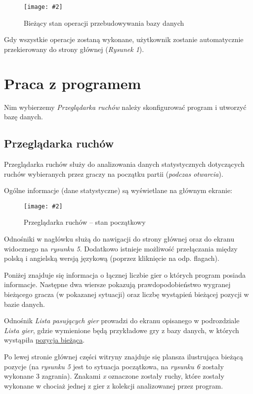 \documentclass[10pt,leqno]{article}
\newcommand{\myimage}[3]{
  \begin{figure}[h!]
    \centering
      \texttt{[image: \#2]}
  \caption{#3}
  \end{figure}
}
\begin{document}
\myimage{0.4}{status.png}{Bieżący stan operacji przebudowywania bazy danych}

Gdy wszystkie operacje zostaną wykonane, użytkownik zostanie automatycznie przekierowany do strony głównej (\emph{Rysunek 1}).

\newpage

\section{Praca z programem}
Nim wybierzemy \emph{Przeglądarka ruchów} należy skonfigurować program i utworzyć bazę danych.

\subsection{Przeglądarka ruchów}

Przeglądarka ruchów służy do analizowania danych statystycznych dotyczących ruchów 
wybieranych przez graczy na początku partii (\emph{podczas otwarcia}).

Ogólne informacje (dane statystyczne) są wyświetlane na głównym ekranie:

\myimage{0.47}{moveBrowserMain.png}{Przeglądarka ruchów -- stan początkowy}

\noindent Odnośniki w nagłówku służą do nawigacji do strony głównej oraz do ekranu widocznego na \emph{rysunku 5}. 
Dodatkowo istnieje możliwość przełączania między polską i angielską wersją językową (poprzez kliknięcie na odp. flagach).

\vspace{0.5em}

\noindent Poniżej znajduje się informacja o łącznej liczbie gier o których program posiada informacje. Następne dwa wiersze pokazują
prawdopodobieństwo wygranej bieżącego gracza (w pokazanej sytuacji) oraz liczbę wystąpień bieżącej pozycji w bazie danych.

\vspace{0.5em}

\noindent Odnośnik \emph{Lista pasujących gier} prowadzi do ekranu opisanego w podrozdziale \emph{Lista gier}, gdzie wymienione będą
przykładowe gry z bazy danych, w których wystąpiła \underline{pozycja bieżąca}.

\vspace{0.5em}

\noindent Po lewej stronie głównej części witryny znajduje się plansza ilustrująca bieżącą pozycje (na \emph{rysunku 5} jest to sytuacja początkowa, 
na \emph{rysunku 6} zostały wykonane 3 zagrania). Znakami \emph{x} oznaczone zostały ruchy, które zostały wykonane w chociaż jednej z
gier z kolekcji analizowanej przez program. 
\end{document}
